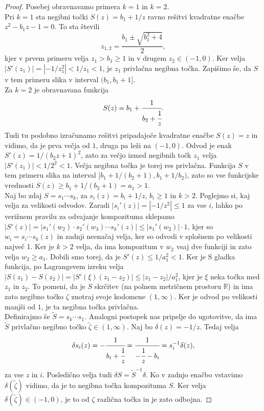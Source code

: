 \documentclass[a4paper,12pt]{article}
\def\R{\mathbb{R}} %
\newenvironment{dokaz}[1][Dokaz]{\begin{proof}}{\end{proof}}
\begin{document}
\begin{dokaz}
    Posebej obravnavamo primera $k = 1$ in $k = 2$.\\
    Pri $k = 1$ sta negibni točki $S(z) = b_1 + 1 / z$ ravno rešitvi kvadratne enačbe $z^2 - b_1z - 1 = 0$. To sta števili 
    \[
        z_{1, 2} = \frac{b_1 \pm \sqrt{b_1^2+4}}{2},
    \]
    kjer v prvem primeru velja $z_1 > b_1 \geq 1$ in v drugem $z_2 \in (-1, 0)$. Ker velja $|S'(z_1)| = |-1/z_1^2| < 1/z_1 < 1$, je $z_1$ privlačna negibna točka. Zapišimo še, da $S$ v tem primeru slika v interval $(b_1, b_1 + 1]$. \\
    Za $k = 2$ je obravnavana funkcija
    \[
        S(z) = b_1 + \cfrac{1}{b_2 + \cfrac{1}{z}}.
    \]
    Tudi tu podobno izračunamo rešitvi pripadajoče kvadratne enačbe $S(z) = z$ in vidimo, da je prva večja od $1$, druga pa leži na $(-1, 0)$. Odvod je enak $S'(z) = 1 / (b_2z + 1)^2$, zato za večjo izmed negibnih točk $z_1$ velja $|S'(z_1)| < 1 / 2^2 < 1$. Večja negibna točka je torej res privlačna. Funkcija $S$ v tem primeru slika na interval $[b_1 + 1/(b_2 + 1), b_1 + 1/b_2)$, zato so vse funkcijske vrednosti $S(z) \geq b_1 + 1/(b_2 + 1) = a_1 > 1$. \\
    Naj bo zdaj $S = s_1 \cdots s_k$, za $s_i(z) = b_i + 1/z$, $b_i \geq 1$ in $k > 2$. Poglejmo si, kaj velja za velikosti odvodov. Zaradi $|s_i'(z)| = |-1 / z^2| \leq 1$ za vse $i$, lahko po verižnem pravilu za odvajanje kompozituma sklepamo $|S'(z)| = |s_1'(w_{2})\cdot s_{2}'(w_{3})\cdots s_k'(z)| \leq |s_1'(w_{2})| \cdot 1$, kjer so $w_i = s_i\cdots s_k(z)$ in zadnji neenačaj velja, ker so odvodi v splošnem po velikosti največ 1. Ker je $k > 2$ velja, da ima kompozitum v $w_2$ vsaj dve funkciji in zato velja $w_2 \geq a_1$. Dobili smo torej, da je $S'(z) \leq 1/a_1^2 < 1$. Ker je S gladka funkcija, po Lagrangevem izreku velja $|S(z_1) - S(z_2)| = |S'(\xi)(z_1 - z_2)| \leq |z_1 - z_2| / a_1^2$, kjer je $\xi$ neka točka med $z_1$ in $z_2$. To pomeni, da je $S$ skrčitev (na polnem metričnem prostoru $\R$) in ima zato negibno točko $\zeta$ znotraj svoje kodomene $(1, \infty)$. Ker je odvod po velikosti manjši od $1$, je ta negibna točka privlačna. \\
    Definirajmo še $\tilde{S} = s_k \cdots s_1$. Analogni postopek nas pripelje do ugotovitve, da ima $\tilde{S}$ privlačno negibno točko $\tilde{\zeta} \in (1, \infty)$. Naj bo $\delta(z) = -1/z$. Tedaj velja
    \[
        \delta s_i (z) = - \cfrac{1}{b_i + \cfrac{1}{z}} = \cfrac{1}{-\cfrac{1}{z} - b_i} = s^{-1}_i \delta (z),
    \]
    za vse $z$ in $i$. Posledično velja tudi $\delta S = \tilde{S}^{-1} \delta$. Ko v zadnjo enačbo vstavimo $\delta (\tilde{\zeta})$ vidimo, da je to negibna točka kompozituma $S$. Ker velja $\delta (\tilde{\zeta}) \in (-1, 0)$, je to od $\zeta$ različna točka in je zato odbojna.
\end{dokaz}
\end{document}
